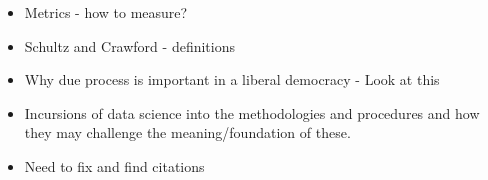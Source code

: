 \documentclass[12pt]{article} %
\begin{document}


\newpage



\newpage
{}
\begin{itemize}
\item Metrics - how to measure?
\item Schultz and Crawford - definitions
\item Why due process is important in a liberal democracy - Look at this
\item Incursions of data science into the methodologies and procedures and how they may challenge the meaning/foundation of these.
\item Need to fix and find citations
\end{itemize}
\end{document}
